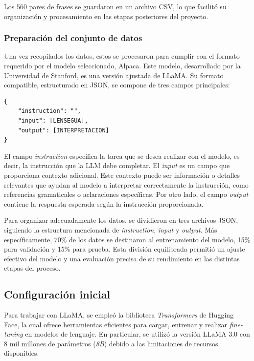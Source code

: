 Los 560 pares de frases se guardaron en un archivo CSV, lo que facilitó su organización y procesamiento en las etapas posteriores del proyecto.


\subsubsection{Preparación del conjunto de datos}

Una vez recopilados los datos, estos se procesaron para cumplir con el formato requerido por el modelo seleccionado, Alpaca. Este modelo, desarrollado por la Universidad de Stanford, es una versión ajustada de LLaMA. Su formato compatible, estructurado en JSON, se compone de tres campos principales:

\vspace{0.5cm}
\begin{lstlisting}
{
    "instruction": "",
    "input": [LENSEGUA],
    "output": [INTERPRETACION]
}
\end{lstlisting}
\vspace{0.3cm}

El campo \textit{instruction} especifica la tarea que se desea realizar con el modelo, es decir, la instrucción que la LLM debe completar. El \textit{input} es un campo que proporciona contexto adicional. Este contexto puede ser información o detalles relevantes que ayudan al modelo a interpretar correctamente la instrucción, como referencias gramaticales o aclaraciones específicas. Por otro lado, el campo \textit{output} contiene la respuesta esperada según la instrucción proporcionada. 

Para organizar adecuadamente los datos, se dividieron en tres archivos JSON, siguiendo la estructura mencionada de \textit{instruction}, \textit{input} y \textit{output}. Más específicamente, 70\% de los datos se destinaron al entrenamiento del modelo, 15\% para validación y 15\% para prueba. Esta división equilibrada permitió un ajuste efectivo del modelo y una evaluación precisa de su rendimiento en las distintas etapas del proceso.







\subsection{Configuración inicial}

Para trabajar con LLaMA, se empleó la biblioteca \textit{Transformers} de Hugging Face, la cual ofrece herramientas eficientes para cargar, entrenar y realizar \textit{fine-tuning} en modelos de lenguaje. En particular, se utilizó la versión LLaMA 3.0 con 8 mil millones de parámetros (\textit{8B}) debido a las limitaciones de recursos disponibles.

